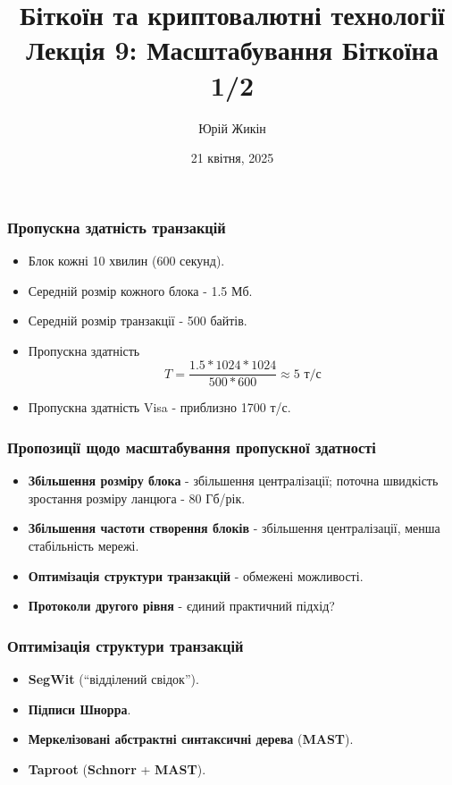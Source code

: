 \documentclass{beamer}
\title{
  Біткоїн та криптовалютні технології \\
  Лекція 9: Масштабування Біткоїна 1/2
}
\author{Юрій Жикін}
\date{21 квітня, 2025}
\begin{document}
\frame{\titlepage}

\begin{frame}
  \frametitle{Пропускна здатність транзакцій}
  \begin{itemize}
  \item Блок кожні 10 хвилин (600 секунд).
  \item Середній розмір кожного блока - 1.5 Мб.
  \item Середній розмір транзакції - 500 байтів.
  \item Пропускна здатність
    $$T = \frac{1.5 * 1024 * 1024}{500 * 600} \approx 5 \text{ т/с}$$
  \item Пропускна здатність Visa - приблизно 1700 т/с.
  \end{itemize}
\end{frame}

\begin{frame}
  \frametitle{Пропозиції щодо масштабування пропускної здатності}
  \begin{itemize}
  \item \textbf{Збільшення розміру блока} - збільшення централізації; поточна
    швидкість зростання розміру ланцюга - 80 Гб/рік.
  \item \textbf{Збільшення частоти створення блоків} - збільшення централізації,
    менша стабільність мережі.
  \item \textbf{Оптимізація структури транзакцій} - обмежені можливості.
  \item \textbf{Протоколи другого рівня} - єдиний практичний підхід?
  \end{itemize}
\end{frame}

\begin{frame}
  \frametitle{Оптимізація структури транзакцій}
  \begin{itemize}
  \item \textbf{SegWit} (``відділений свідок'').
  \item \textbf{Підписи Шнорра}.
  \item \textbf{Меркелізовані абстрактні синтаксичні дерева} (\textbf{MAST}).
  \item \textbf{Taproot} (\textbf{Schnorr} + \textbf{MAST}).
  \end{itemize}
\end{frame}
\end{document}
